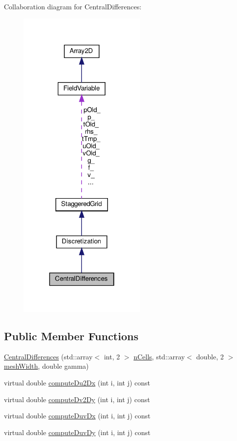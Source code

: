Collaboration diagram for Central\+Differences\+:
\nopagebreak
\begin{figure}[H]
\begin{center}
\leavevmode
\includegraphics[width=178pt]{classCentralDifferences__coll__graph}
\end{center}
\end{figure}
\subsection*{Public Member Functions}
\begin{DoxyCompactItemize}
\item 
\mbox{\hyperlink{classCentralDifferences_ac09fd44ef6658391ce08309f99774272}{Central\+Differences}} (std\+::array$<$ int, 2 $>$ \mbox{\hyperlink{classStaggeredGrid_af37816ccb2c46e4a514dedac261897bf}{n\+Cells}}, std\+::array$<$ double, 2 $>$ \mbox{\hyperlink{classStaggeredGrid_a330856d4efe952771daf0753ef84068e}{mesh\+Width}}, double gamma)
\item 
virtual double \mbox{\hyperlink{classCentralDifferences_abd31168fd39ed2d61f3459a9aa030204}{compute\+Du2\+Dx}} (int i, int j) const
\item 
virtual double \mbox{\hyperlink{classCentralDifferences_a1fc0c5d01fcc12943e1f04e1b2548c92}{compute\+Dv2\+Dy}} (int i, int j) const
\item 
virtual double \mbox{\hyperlink{classCentralDifferences_a46104c3604f533bda430fc75110c956a}{compute\+Duv\+Dx}} (int i, int j) const
\item 
virtual double \mbox{\hyperlink{classCentralDifferences_a9d2f160a453d61537ff680afc2f9e67a}{compute\+Duv\+Dy}} (int i, int j) const
\end{DoxyCompactItemize}
